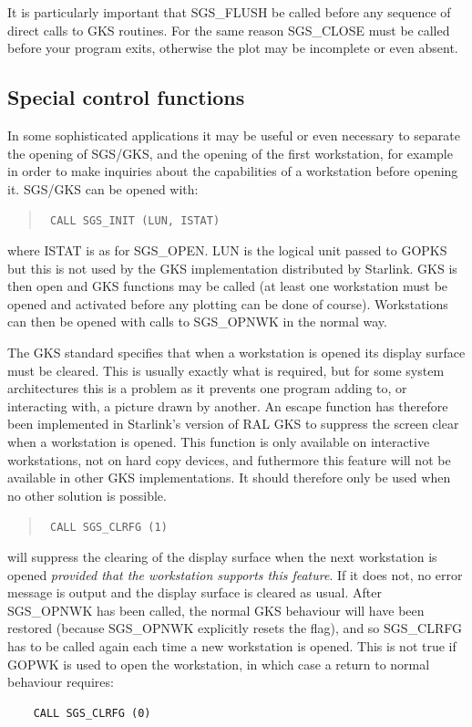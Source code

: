\documentclass[11pt]{article}
\newcommand{\htmlref}[2]{#1}
\begin{document}
It is particularly important that SGS\_FLUSH be called
before any sequence of direct calls to GKS routines.
For the same reason 
\htmlref{SGS\_CLOSE}{SGS_CLOSE} must be called before your program exits,
otherwise the plot may be incomplete or even absent.

\subsection {Special control functions}\label{sec-special}

In some sophisticated applications it may be useful or even necessary to
separate the opening of SGS/GKS, and the opening of the first workstation,
for example in order to make inquiries about the capabilities of a workstation
before opening it. SGS/GKS can be opened with:
\begin{quote}{\tt
    CALL \htmlref{SGS\_INIT}{SGS_INIT} (LUN, ISTAT)}
\end{quote}
where ISTAT is as for \htmlref{SGS\_OPEN}{SGS_OPEN}. LUN is the logical
unit passed to GOPKS but this is not used by the GKS implementation
distributed by Starlink.
GKS is then open and GKS functions
may be called (at least one workstation must be opened and activated before
any plotting can be done of course). Workstations can then be opened with
calls to \htmlref{SGS\_OPNWK}{SGS_OPNWK} in the normal way.

The GKS standard specifies that when a workstation is opened its display
surface must be cleared. This is usually exactly what is required, but for
some system architectures this is a problem as it prevents one program adding
to, or interacting with, a picture drawn by another. An escape function
has therefore been implemented in Starlink's version of RAL GKS to suppress
the screen clear when a workstation is opened. This function is only available
on interactive workstations, not on hard copy devices, and futhermore this
feature will not be available in other GKS implementations. It should therefore
only be used when no other solution is possible.
\begin{quote}{\tt
    CALL \htmlref{SGS\_CLRFG}{SGS_CLRFG} (1)}
\end{quote}
will suppress the clearing of the display surface when the next workstation is
opened {\em provided that the workstation supports this feature}. 
If it does not,
no error message is output and the display surface is cleared as usual. After
SGS\_OPNWK has been called, the normal GKS behaviour will have been restored
(because SGS\_OPNWK explicitly resets the flag), and so SGS\_CLRFG has to be
called again each time a new workstation is opened. This is not true if GOPWK
is used to open the workstation, in which case a return to
normal behaviour requires:
\begin{verbatim}
    CALL SGS_CLRFG (0)
\end{verbatim}
\end{document}
